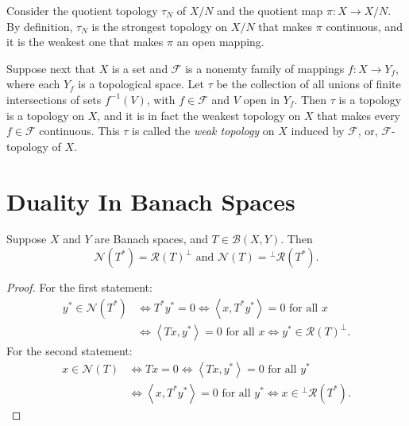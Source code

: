 \begin{example}
  \label{example-quotient-topology-comparison}
  Consider the quotient topology \( \tau_N \) of \( X / N \) and the quotient map \( \pi: X \to X / N \).
  By definition, \( \tau_N \) is the strongest topology on \( X / N \) that makes \( \pi \) continuous, and it is the weakest one that makes \( \pi \) an open mapping.
\end{example}

\begin{definition}
  \label{definition-weak-topology}
  Suppose next that \( X \) is a set and \( \mathcal{F} \) is a nonemty family of mappings \( f: X \to Y_f \), where each \( Y_f \) is a topological space.
  Let \( \tau \) be the collection of all unions of finite intersections of sets \( f^{-1}(V) \), with \( f \in \mathcal{F} \) and \( V \) open in \( Y_f \).
  Then \( \tau \) is a topology is a topology on \( X \), and it is in fact the weakest topology on \( X \) that makes every \( f \in \mathcal{F} \) continuous.
  This \( \tau \) is called the \emph{weak topology} on \( X \) induced by \( \mathcal{F} \), or, \( \mathcal{F} \)-topology of \( X \).
\end{definition}

\section{Duality In Banach Spaces}
\label{section-duality-in-Banach-spaces}

\begin{theorem}
  \label{theorem-range-null-adjoint-and-annihilators}
  Suppose \( X \) and \( Y \) are Banach spaces, and \( T \in \mathcal{B}(X, Y) \).
  Then
  \[
    \mathcal{N}(T^*) = \mathcal{R}(T)^{\perp} \text{ and } \mathcal{N}(T) = {}^{\perp}\mathcal{R}(T^*).
  \]
\end{theorem}
\begin{proof}
  For the first statement:
  \begin{align*}
    y^* \in \mathcal{N}(T^*) &\iff T^* y^* = 0 \iff \left\langle x, T^* y^* \right\rangle = 0 \text{ for all } x\\
                             &\iff \left\langle Tx, y^* \right\rangle = 0 \text{ for all } x \iff y^* \in \mathcal{R}(T)^{\perp}.
  \end{align*}
  For the second statement:
  \begin{align*}
    x \in \mathcal{N}(T) &\iff Tx = 0 \iff \left\langle Tx, y^* \right\rangle = 0 \text{ for all } y^*\\
                         & \iff \left\langle x, T^* y^* \right\rangle = 0 \text{ for all } y^* \iff x \in {}^{\perp} \mathcal{R}(T^*).
  \end{align*}
\end{proof}

